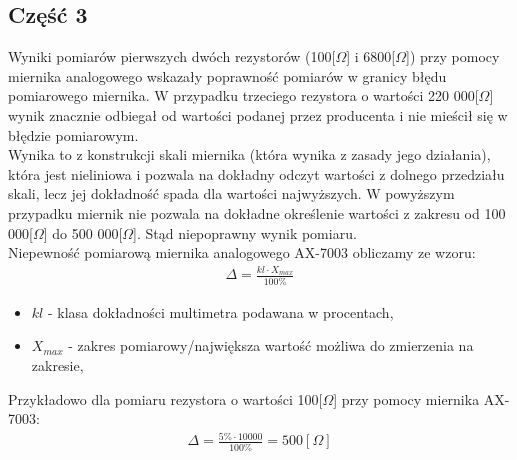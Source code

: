 \documentclass[11pt]{article}
\begin{document}
    \subsection*{Część 3}
    Wyniki pomiarów pierwszych dwóch rezystorów (100[$\Omega$] i 6800[$\Omega$]) przy
    pomocy miernika analogowego wskazały poprawność pomiarów w granicy błędu pomiarowego miernika.
    W przypadku trzeciego rezystora o wartości 220 000[$\Omega$] wynik znacznie odbiegał od wartości
    podanej przez producenta i nie mieścił się w błędzie pomiarowym. \\
    \indent Wynika to z konstrukcji skali
    miernika (która wynika z zasady jego działania), która jest nieliniowa i pozwala na dokładny odczyt
    wartości z dolnego przedziału skali, lecz jej dokładność spada dla wartości najwyższych. W powyższym
    przypadku miernik nie pozwala na dokładne określenie wartości z zakresu od 100 000[$\Omega$] do 500 000[$\Omega$].
    Stąd niepoprawny wynik pomiaru.\\
    \newpage
    \noindent Niepewność pomiarową miernika analogowego AX-7003 obliczamy ze wzoru:
    \begin{gather*}
        \Delta=\frac{kl\cdot X_{max}}{100\%}
    \end{gather*}
    {\footnotesize
        \begin{itemize}
            \setlength\itemsep{0em}
            \item[] \boldmath$kl$ - klasa dokładności multimetra podawana w procentach,
            \item[] \boldmath$X_{max}$ - zakres pomiarowy/największa wartość możliwa do zmierzenia na zakresie,
        \end{itemize}}
   \noindent Przykładowo dla pomiaru rezystora o wartości 100[$\Omega$] przy pomocy miernika AX-7003:
    \begin{gather*}
        \Delta=\frac{5\%\cdot 10000}{100\%}=500[\Omega]
    \end{gather*}
\end{document}
